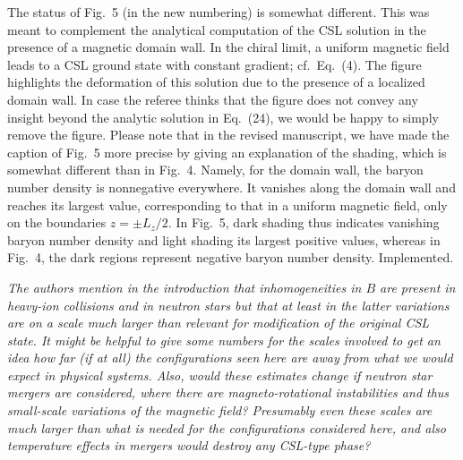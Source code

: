 \documentclass[11pt,a4paper]{article}
\newcommand{\impl}{\textcolor{green!60!black}{Implemented.}}
\newcommand{\referee}[1]{\medskip\noindent{\sffamily\large #1)~Referee:}\par\smallskip}
\newenvironment{reftext}{\itshape}{\par}
\begin{document}
The status of Fig.~5 (in the new numbering) is somewhat different. This was meant to complement the analytical computation of the CSL solution in the presence of a magnetic domain wall. In the chiral limit, a uniform magnetic field leads to a CSL ground state with constant gradient; cf.\ Eq.~(4). The figure highlights the deformation of this solution due to the presence of a localized domain wall. In case the referee thinks that the figure does not convey any insight beyond the analytic solution in Eq.~(24), we would be happy to simply remove the figure. Please note that in the revised manuscript, we have made the caption of Fig.~5 more precise by giving an explanation of the shading, which is somewhat different than in Fig.~4. Namely, for the domain wall, the baryon number density is nonnegative everywhere. It vanishes along the domain wall and reaches its largest value, corresponding to that in a uniform magnetic field, only on the boundaries $z=\pm L_z/2$. In Fig.~5, dark shading thus indicates vanishing baryon number density and light shading its largest positive values, whereas in Fig.~4, the dark regions represent negative baryon number density. \impl

\referee{4}
\begin{reftext}
The authors mention in the introduction that inhomogeneities in $B$ are present in heavy-ion collisions and in neutron stars but that at least in the latter variations are on a scale much larger than relevant for modification of the original CSL state. It might be helpful to give some numbers for the scales involved to get an idea how far (if at all) the configurations seen here are away from what we would expect in physical systems. Also, would these estimates change if neutron star mergers are considered, where there are magneto-rotational instabilities and thus small-scale variations of the magnetic field? Presumably even these scales are much larger than what is needed for the configurations considered here, and also temperature effects in mergers would destroy any CSL-type phase?
\end{reftext}
\end{document}

